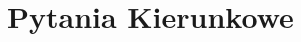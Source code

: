 \section{Pytania Kierunkowe}

\clearpage

\clearpage

\clearpage

\clearpage

\clearpage

\clearpage

\clearpage

\clearpage